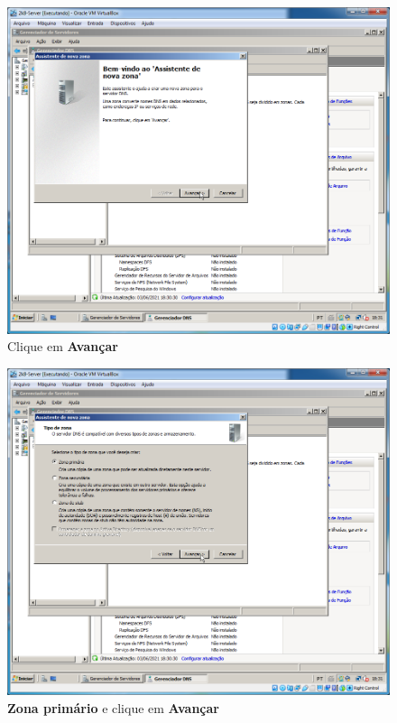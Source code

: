 \documentclass[10pt]{article}
\begin{document}
\begin{figure}[H]
    \centering
    \caption{Clique em \textbf{Avançar}}
    \label{fig:DNS021}
    \includegraphics[width=\linewidth]{images/windows_server/dns/021.png}
\end{figure}
\begin{figure}[H]
    \centering
    \caption{\textbf{Zona primário} e clique em \textbf{Avançar}}
    \label{fig:DNS022}
    \includegraphics[width=\linewidth]{images/windows_server/dns/022.png}
\end{figure}
\end{document}

